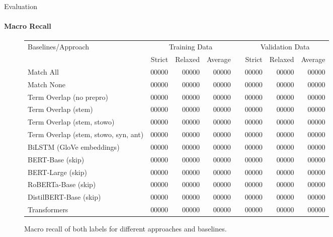 \documentclass[english,handout]{mlutalk}
\begin{document}
\begin{frame}{Evaluation}
  \framesubtitle{Macro Recall}
  \begin{figure}
    \centering
    \caption{Macro recall of both labels for different approaches and baselines.}
    \tiny
    \begin{tabular}{lrrrlrrr}
      \toprule
      Baselines/Approach & \multicolumn{3}{c}{Training Data} & & \multicolumn{3}{c}{Validation Data}\\ \cmidrule{2-4} \cmidrule{6-8}
        & Strict & Relaxed & Average & & Strict & Relaxed & Average\\
      \midrule
      Match All                           & 00000 & 00000 & 00000 & & 00000 & 00000 & 00000\\
      Match None                          & 00000 & 00000 & 00000 & & 00000 & 00000 & 00000\\
      Term Overlap (no prepro)            & 00000 & 00000 & 00000 & & 00000 & 00000 & 00000\\
      Term Overlap (stem)                 & 00000 & 00000 & 00000 & & 00000 & 00000 & 00000\\
      Term Overlap (stem, stowo)          & 00000 & 00000 & 00000 & & 00000 & 00000 & 00000\\
      Term Overlap (stem, stowo, syn, ant)& 00000 & 00000 & 00000 & & 00000 & 00000 & 00000\\
      \midrule
      BiLSTM (GloVe embeddings)           & 00000 & 00000 & 00000 & & 00000 & 00000 & 00000\\
      BERT-Base (skip)                    & 00000 & 00000 & 00000 & & 00000 & 00000 & 00000\\
      BERT-Large (skip)                   & 00000 & 00000 & 00000 & & 00000 & 00000 & 00000\\
      RoBERTa-Base (skip)                 & 00000 & 00000 & 00000 & & 00000 & 00000 & 00000\\
      DistilBERT-Base (skip)              & 00000 & 00000 & 00000 & & 00000 & 00000 & 00000\\
      Transformers                        & 00000 & 00000 & 00000 & & 00000 & 00000 & 00000\\
      \bottomrule
    \end{tabular}
  \end{figure}
\end{frame}
\end{document}
